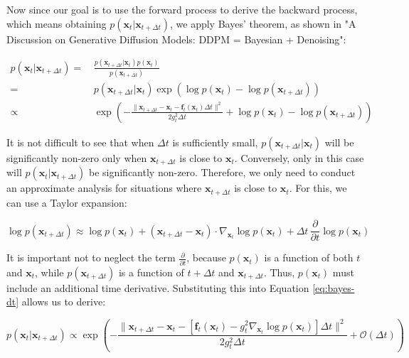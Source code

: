 Now since our goal is to use the forward process to derive the backward process, which means obtaining \( p(\mathbf{x}_t|\mathbf{x}_{t+\Delta t}) \), we apply Bayes' theorem, as shown in "A Discussion on Generative Diffusion Models: DDPM = Bayesian + Denoising":

\begin{equation}
\begin{aligned}
p(\mathbf{x}_t|\mathbf{x}_{t+\Delta t}) =&\, \frac{p(\mathbf{x}_{t+\Delta t}|\mathbf{x}_t) p(\mathbf{x}_t)}{p(\mathbf{x}_{t+\Delta t})} \\
=&\, p(\mathbf{x}_{t+\Delta t}|\mathbf{x}_t) \exp\left(\log p(\mathbf{x}_t) - \log p(\mathbf{x}_{t+\Delta t})\right) \\
\propto&\, \exp\left(-\frac{\|\mathbf{x}_{t+\Delta t} - \mathbf{x}_t - \mathbf{f}_t(\mathbf{x}_t) \Delta t\|^2}{2 g_t^2 \Delta t} + \log p(\mathbf{x}_t) - \log p(\mathbf{x}_{t+\Delta t})\right)
\end{aligned} \label{eq:bayes-dt}
\end{equation}

It is not difficult to see that when \( \Delta t \) is sufficiently small, \( p(\mathbf{x}_{t+\Delta t}|\mathbf{x}_t) \) will be significantly non-zero only when \( \mathbf{x}_{t+\Delta t} \) is close to \( \mathbf{x}_t \). Conversely, only in this case will \( p(\mathbf{x}_t|\mathbf{x}_{t+\Delta t}) \) be significantly non-zero. Therefore, we only need to conduct an approximate analysis for situations where \( \mathbf{x}_{t+\Delta t} \) is close to \( \mathbf{x}_t \). For this, we can use a Taylor expansion:

\begin{equation}
\log p(\mathbf{x}_{t+\Delta t}) \approx \log p(\mathbf{x}_t) + (\mathbf{x}_{t+\Delta t} - \mathbf{x}_t) \cdot \nabla_{\mathbf{x}_t} \log p(\mathbf{x}_t) + \Delta t \, \frac{\partial}{\partial t} \log p(\mathbf{x}_t)
\end{equation}

It is important not to neglect the term \( \frac{\partial}{\partial t} \), because \( p(\mathbf{x}_t) \) is a function of both \( t \) and \( \mathbf{x}_t \), while \( p(\mathbf{x}_{t+\Delta t}) \) is a function of \( t + \Delta t \) and \( \mathbf{x}_{t+\Delta t} \). Thus, \( p(\mathbf{x}_t) \) must include an additional time derivative. Substituting this into Equation \eqref{eq:bayes-dt} allows us to derive:

\begin{equation}
p(\mathbf{x}_t|\mathbf{x}_{t+\Delta t}) \propto \exp\left(-\frac{\|\mathbf{x}_{t+\Delta t} - \mathbf{x}_t - \left[\mathbf{f}_t(\mathbf{x}_t) - g_t^2 \nabla_{\mathbf{x}_t} \log p(\mathbf{x}_t) \right] \Delta t\|^2}{2 g_t^2 \Delta t} + \mathcal{O}(\Delta t)\right)
\end{equation}

